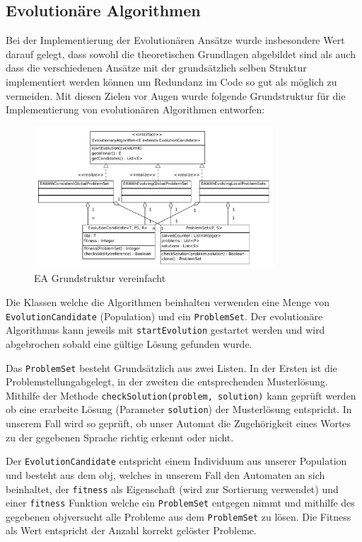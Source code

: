 \subsection{Evolutionäre Algorithmen}
Bei der Implementierung der Evolutionären Ansätze wurde insbesondere Wert darauf gelegt, dass sowohl die theoretischen Grundlagen abgebildet sind als auch dass die verschiedenen Ansätze mit der grundsätzlich selben Struktur implementiert werden können um Redundanz im Code so gut als möglich zu vermeiden. Mit diesen Zielen vor Augen wurde folgende Grundstruktur für die Implementierung von evolutionären Algorithmen entworfen:

\begin{figure}[h]
  \centering
  \includegraphics[width=0.8\textwidth]{images/simple_uml_evolution.pdf}
  \caption[EA Grundstruktur Klassendiagramm]{EA Grundstruktur vereinfacht}
  \label{fig:ea_classdiag_simple}
\end{figure}

Die Klassen welche die Algorithmen beinhalten verwenden eine Menge von \lstinline$EvolutionCandidate$ (Population) und ein \lstinline$ProblemSet$. Der evolutionäre Algorithmus kann jeweils mit \lstinline$startEvolution$ gestartet werden und wird abgebrochen sobald eine gültige Lösung gefunden wurde.

Das \lstinline$ProblemSet$ besteht Grundsätzlich aus zwei Listen. In der Ersten ist die \flqq Problemstellung\frqq abgelegt, in der zweiten die entsprechenden Musterlösung. Mithilfe der Methode \lstinline$checkSolution(problem, solution)$ kann geprüft werden ob eine erarbeite Lösung (Parameter \lstinline$solution$) der Musterlösung entspricht. In unserem Fall wird so geprüft, ob unser Automat die Zugehörigkeit eines Wortes zu der gegebenen Sprache richtig erkennt oder nicht.

Der \lstinline$EvolutionCandidate$ entspricht einem Individuum aus unserer Population und besteht aus dem \flqq obj\frqq, welches in unserem Fall den Automaten an sich beinhaltet, der \lstinline$fitness$ als Eigenschaft (wird zur Sortierung verwendet) und einer \lstinline$fitness$ Funktion welche ein \lstinline$ProblemSet$ entgegen nimmt und mithilfe des gegebenen \flqq obj\frqq versucht alle Probleme aus dem \lstinline$ProblemSet$ zu lösen. Die Fitness als Wert entspricht der Anzahl korrekt gelöster Probleme.

